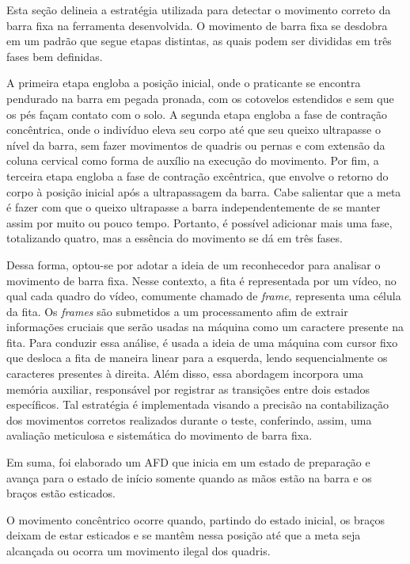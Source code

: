 Esta seção delineia a estratégia utilizada para detectar o movimento correto da barra fixa na ferramenta desenvolvida. O movimento de barra fixa se desdobra em um padrão que segue etapas distintas, as quais podem ser divididas em três fases bem definidas.

A primeira etapa engloba a posição inicial, onde o praticante se encontra pendurado na barra em pegada pronada, com os cotovelos estendidos e sem que os pés façam contato com o solo. A segunda etapa engloba a fase de contração concêntrica, onde o indivíduo eleva seu corpo até que seu queixo ultrapasse o nível da barra, sem fazer movimentos de quadris ou pernas e com extensão da coluna cervical como forma de auxílio na execução do movimento. Por fim, a terceira etapa engloba a fase de contração excêntrica, que envolve o retorno do corpo à posição inicial após a ultrapassagem da barra. Cabe salientar que a meta é fazer com que o queixo ultrapasse a barra independentemente de se manter assim por muito ou pouco tempo. Portanto, é possível adicionar mais uma fase, totalizando quatro, mas a essência do movimento se dá em três fases.

Dessa forma, optou-se por adotar a ideia de um reconhecedor para analisar o movimento de barra fixa. Nesse contexto, a fita é representada por um vídeo, no qual cada quadro do vídeo, comumente chamado de \textit{frame}, representa uma célula da fita. Os \textit{frames} são submetidos a um processamento afim de extrair informações cruciais que serão usadas na máquina como um caractere presente na fita. Para conduzir essa análise, é usada a ideia de uma máquina com cursor fixo que desloca a fita de maneira linear para a esquerda, lendo sequencialmente os caracteres presentes à direita. Além disso, essa abordagem incorpora uma memória auxiliar, responsável por registrar as transições entre dois estados específicos. Tal estratégia é implementada visando a precisão na contabilização dos movimentos corretos realizados durante o teste, conferindo, assim, uma avaliação meticulosa e sistemática do movimento de barra fixa.

Em suma, foi elaborado um \ac{AFD} que inicia em um estado de preparação e avança para o estado de início somente quando as mãos estão na barra e os braços estão esticados.

O movimento concêntrico ocorre quando, partindo do estado inicial, os braços deixam de estar esticados e se mantêm nessa posição até que a meta seja alcançada ou ocorra um movimento ilegal dos quadris.

